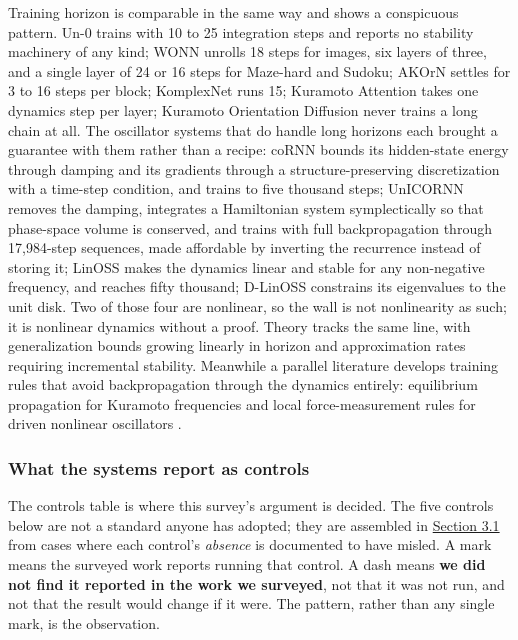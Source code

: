 \documentclass[10pt]{article}
\begin{document}
Training horizon is comparable in the same way and shows a conspicuous
pattern. Un-0 trains with 10 to 25 integration steps and reports no
stability machinery of any kind; WONN unrolls 18 steps for images, six
layers of three, and a single layer of 24 or 16 steps for Maze-hard and
Sudoku; AKOrN settles for 3 to 16 steps per block; KomplexNet runs 15;
Kuramoto Attention takes one dynamics step per layer; Kuramoto
Orientation Diffusion never trains a long chain at all. The oscillator
systems that do handle long horizons each brought a guarantee with them
rather than a recipe: coRNN bounds its hidden-state energy through
damping and its gradients through a structure-preserving discretization
with a time-step condition, and trains to five thousand steps; UnICORNN
removes the damping, integrates a Hamiltonian system symplectically so
that phase-space volume is conserved, and trains with full
backpropagation through 17,984-step sequences, made affordable by
inverting the recurrence instead of storing it; LinOSS makes the
dynamics linear and stable for any non-negative frequency, and reaches
fifty thousand; D-LinOSS constrains its eigenvalues to the unit disk.
Two of those four are nonlinear, so the wall is not nonlinearity as
such; it is nonlinear dynamics without a proof. Theory tracks the same
line, with generalization bounds growing linearly in horizon and
approximation rates requiring incremental stability. Meanwhile a
parallel literature develops training rules that avoid backpropagation
through the dynamics entirely: equilibrium propagation for Kuramoto
frequencies \citep{ahmadi2026} and local force-measurement rules for
driven nonlinear oscillators \citep{bosch2025}.

\subsubsection{What the systems report as controls}\label{sec-2-3-3}

The controls table is where this survey's argument is decided. The five
controls below are not a standard anyone has adopted; they are assembled
in \hyperref[sec-3-1]{Section 3.1} from cases where each control's
\emph{absence} is documented to have misled. A mark means the surveyed
work reports running that control. A dash means \textbf{we did not find
it reported in the work we surveyed}, not that it was not run, and not
that the result would change if it were. The pattern, rather than any
single mark, is the observation.
\end{document}
